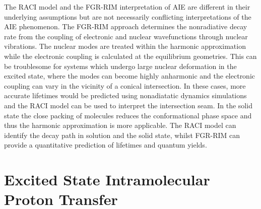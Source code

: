 The \ac{RACI} model and the \ac{FGR-RIM} interpretation of AIE are different in their underlying assumptions but are not necessarily conflicting interpretations of the AIE phenomenon. The \ac{FGR-RIM} approach determines the nonradiative decay rate from the coupling of electronic and nuclear wavefunctions through nuclear vibrations. The nuclear modes are treated within the harmonic approximation while the electronic coupling is calculated at the equilibrium geometries. This can be troublesome for systems which undergo large nuclear deformation in the excited state, where the modes can become highly anharmonic and the electronic coupling can vary in the vicinity of a conical intersection. In these cases,  more accurate lifetimes would be predicted using nonadiatatic dynamics simulations and the \ac{RACI} model can be used to interpret the intersection seam.  In the solid state the close packing of molecules reduces the conformational phase space and thus the harmonic approximation is more applicable. The \ac{RACI} model can identify the decay path in solution and the solid state, whilst \ac{FGR-RIM} can provide a quantitative prediction of lifetimes and quantum yields.

\section{Excited State Intramolecular Proton Transfer}\label{section: lom ESIPT}
